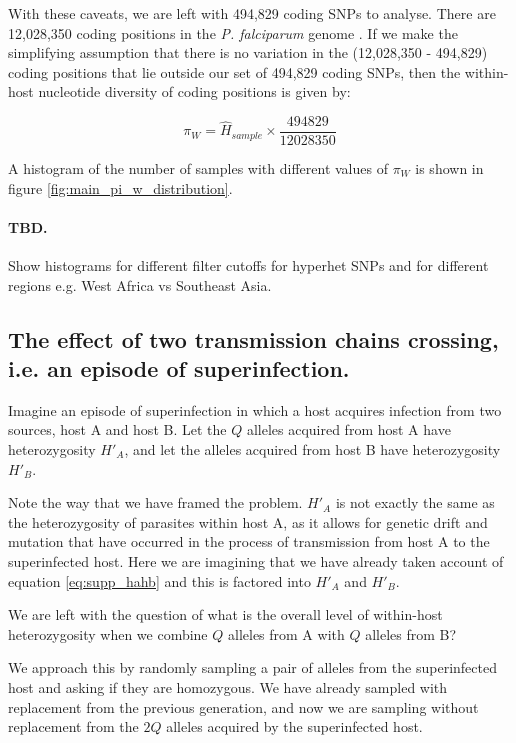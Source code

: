 \documentclass[_main.tex]{subfiles}
\begin{document}
With these caveats, we are left with 494,829 coding SNPs to analyse.   There are 12,028,350 coding positions in the \textit{P. falciparum} genome \cite{Gardner2002}.  If we make the simplifying assumption that there is no variation in the (12,028,350 - 494,829) coding positions that lie outside our set of 494,829 coding SNPs, then the within-host nucleotide diversity of coding positions is given by: 

\begin{equation*}
\pi_W = \widehat{H}_{sample} \times \frac{494829}{12028350}
\end{equation*}

A histogram of the number of samples with different values of $\pi_W$ is shown in figure \ref{fig:main_pi_w_distribution}.  

\paragraph{TBD.}  Show histograms for different filter cutoffs for hyperhet SNPs and for different regions e.g. West Africa vs Southeast Asia.   



\subsection{The effect of two transmission chains crossing, i.e. an episode of superinfection.}
\label{supp_episode_superinfection}

Imagine an episode of superinfection in which  a host acquires infection from two sources, host A and host B.  Let the $Q$ alleles acquired from host A have heterozygosity $H'_A$, and let the alleles acquired from host B have heterozygosity $H'_B$.

Note the way that we have framed the problem.  $H'_A$ is not exactly the same as the heterozygosity of parasites within host A, as it allows for genetic drift and mutation that have occurred in the process of transmission from host A to the superinfected host.  Here we are imagining that we have already taken account of equation \ref{eq:supp_hahb} and this is factored into $H'_A$ and $H'_B$.

We are left with the question of what is the overall level of within-host heterozygosity when we combine $Q$ alleles from A with $Q$ alleles from B?  

We approach this by randomly sampling a pair of alleles from the superinfected host and asking if they are homozygous.  We have already sampled with replacement from the previous generation, and now we are sampling without replacement from the $2Q$ alleles acquired by the superinfected host.
\end{document}
